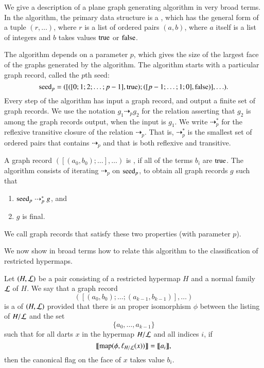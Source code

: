 \bigskip

We give a description of a plane graph generating algorithm in very
broad terms.  In the algorithm, the primary data structure is a
, which has the general form of a tuple
$(r,\ldots)$, where $r$ is a list of ordered pairs $(a,b)$, where
$a$ itself is a list of integers and $b$ takes values ${\operatorname{true}}$ or
${\operatorname{false}}$.


The algorithm depends on a parameter $p$, which gives the size of the
largest face of the graphs generated by the algorithm.  The algorithm
starts with a particular graph record, called the $p$th seed:
\[
{\operatorname{seed}}_p =
([   
 ([0;1;2;\ldots;p-1],{\operatorname{true}}); ([p-1;\ldots;1;0],{\operatorname{false}}) ],\ldots).
\]
Every step of the algorithm has input a graph record, and output a
finite set of graph records.  We use the notation $g_1
\dashrightarrow_p g_2$ for the relation asserting that $g_2$ is among
the graph records output, when the input is $g_1$.  We write
$\dashrightarrow_p^*$ for the reflexive transitive closure of the
relation $\dashrightarrow_p$.  That is, $\dashrightarrow_p^*$ is the
smallest set of ordered pairs that contains $\dashrightarrow_p$ and
that is both reflexive and transitive.

A graph record $([(a_0,b_0);\ldots],\ldots)$ is , if all of
the terms $b_i$ are ${\operatorname{true}}$.  
The algorithm consists of iterating $\dashrightarrow_p$ on  ${\operatorname{seed}}_p$,
to obtain all graph records $g$ such that
\begin{enumerate}
\item ${\operatorname{seed}}_p \dashrightarrow_p^* g$, and
\item $g$ is final.
\end{enumerate}
We call  graph records that satisfy these two properties
 (with parameter $p$).
%
%
%

We now show in broad terms how to relate this algorithm to the
classification of restricted hypermaps.

\begin{definition}[record]
  Let $(H,{\cal L})$ be a pair consisting of a restricted hypermap $H$
  and a normal family ${\cal L}$ of $H$.  We say that a graph record
\[
([(a_0,b_0);\ldots;(a_{k-1},b_{k-1})],\ldots)
\]
is a  of $(H,{\cal L})$ provided that there is an
proper isomorphism $\phi$ between the listing of $H/{\cal L}$ and the
set
\[
\{a_0,\ldots,a_{k-1}\}
\]
such that for all darts $x$ in the hypermap $H/{\cal L}$ and all
indices $i$, if
\[
{\llbracket{{\operatorname{map}}(\phi,\ell_{H/{\cal L}}(x))}\rrbracket} = {\llbracket{a_i}\rrbracket},
\]
then the canonical flag on the face of $x$ takes value $b_i$.
\end{definition}


